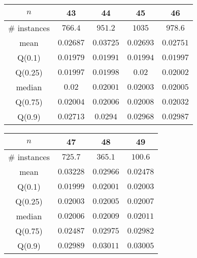 \begin{tabular}{c|cccc} 
\hline 
$n$ & 43 & 44 & 45 & 46 \tabularnewline 
\hline 
\hline 
\# instances & $766.4$ & $951.2$ & $1035$ & $978.6$ \tabularnewline 
mean & $0.02687$ & $0.03725$ & $0.02693$ & $0.02751$ \tabularnewline 
Q(0.1) & $0.01979$ & $0.01991$ & $0.01994$ & $0.01997$ \tabularnewline 
Q(0.25) & $0.01997$ & $0.01998$ & $0.02$ & $0.02002$ \tabularnewline 
median & $0.02$ & $0.02001$ & $0.02003$ & $0.02005$ \tabularnewline 
Q(0.75) & $0.02004$ & $0.02006$ & $0.02008$ & $0.02032$ \tabularnewline 
Q(0.9) & $0.02713$ & $0.0294$ & $0.02968$ & $0.02987$ \tabularnewline 
\hline 
\end{tabular} 
\medskip{} 

\begin{tabular}{c|ccc} 
\hline 
$n$ & 47 & 48 & 49 \tabularnewline 
\hline 
\hline 
\# instances & $725.7$ & $365.1$ & $100.6$ \tabularnewline 
mean & $0.03228$ & $0.02966$ & $0.02478$ \tabularnewline 
Q(0.1) & $0.01999$ & $0.02001$ & $0.02003$ \tabularnewline 
Q(0.25) & $0.02003$ & $0.02005$ & $0.02007$ \tabularnewline 
median & $0.02006$ & $0.02009$ & $0.02011$ \tabularnewline 
Q(0.75) & $0.02487$ & $0.02975$ & $0.02982$ \tabularnewline 
Q(0.9) & $0.02989$ & $0.03011$ & $0.03005$ \tabularnewline 
\hline 
\end{tabular} 
\medskip{} 

